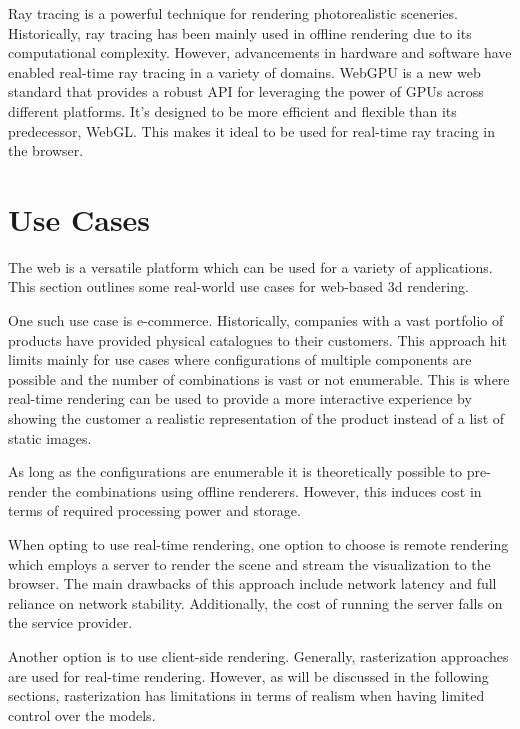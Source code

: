 
Ray tracing is a powerful technique for rendering photorealistic sceneries. Historically, ray tracing has been mainly used in offline rendering due to its computational complexity. However, advancements in hardware and software have enabled real-time ray tracing in a variety of domains.
WebGPU is a new web standard that provides a robust API for leveraging the power of GPUs across different platforms. It's designed to be more efficient and flexible than its predecessor, WebGL. This makes it ideal to be used for real-time ray tracing in the browser.

\section{Use Cases}

The web is a versatile platform which can be used for a variety of applications. This section outlines some real-world use cases for web-based 3d rendering.

One such use case is e-commerce. Historically, companies with a vast portfolio of products have provided physical catalogues to their customers. This approach hit limits mainly for use cases where configurations of multiple components are possible and the number of combinations is vast or not enumerable. This is where real-time rendering can be used to provide a more interactive experience by showing the customer a realistic representation of the product instead of a list of static images.

As long as the configurations are enumerable it is theoretically possible to pre-render the combinations using offline renderers. However, this induces cost in terms of required processing power and storage.

When opting to use real-time rendering, one option to choose is remote rendering which employs a server to render the scene and stream the visualization to the browser. The main drawbacks of this approach include network latency and full reliance on network stability. Additionally, the cost of running the server falls on the service provider.

Another option is to use client-side rendering. Generally, rasterization approaches are used for real-time rendering. However, as will be discussed in the following sections, rasterization has limitations in terms of realism when having limited control over the models.

